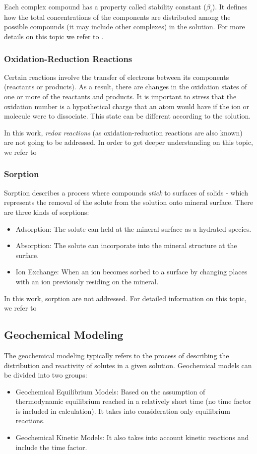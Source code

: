 Each complex compound has a property called stability constant ($\beta_i$). It defines how the total concentrations of the components are distributed among the possible compounds (it may include other complexes) in the solution. For more details on this topic we refer to \cite{Kehew:00}.

\subsubsection{Oxidation-Reduction Reactions}
Certain reactions involve the transfer of electrons between its components (reactants or products). As a result, there are changes in the oxidation states of one or more of the reactants and products. It is important to stress that the oxidation number is a hypothetical charge that an atom would have if the ion or molecule were to dissociate. This state can be different according to the solution. 

In this work, \emph{redox reactions} (as oxidation-reduction reactions are also known) are not going to be addressed. In order to get deeper understanding on this topic, we refer to \cite{Petrucci:07}


\subsubsection{Sorption}
Sorption describes a process where compounds \emph{stick} to surfaces of solids - which represents the removal of the solute from the solution onto mineral surface. There are three kinds of sorptions: 
\begin{itemize}
\item Adsorption: The solute can held at the mineral surface as a hydrated species.
\item Absorption: The solute can incorporate into the mineral structure at the surface.
\item Ion Exchange: When an ion becomes sorbed to a surface by changing places with an ion previously residing on the mineral.
\end{itemize}

In this work, sorption are not addressed. For detailed information on this topic, we refer to \cite{Freeze:79}

\subsection{Geochemical Modeling}
The geochemical modeling typically refers to the process of describing the distribution and reactivity of solutes in a given solution. Geochemical models can be divided into two groups:
\begin{itemize}
\item Geochemical Equilibrium Models: Based on the assumption of thermodynamic equilibrium reached in a relatively short time (no time factor is included in calculation). It takes into consideration only equilibrium reactions.
\item Geochemical Kinetic Models: It also takes into account kinetic reactions and include the time factor. 
\end{itemize}

